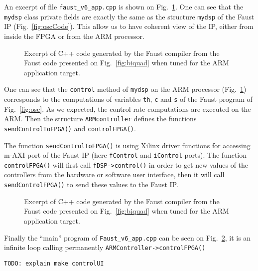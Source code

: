 An excerpt of file {\tt faust\_v6\_app.cpp} is shown on Fig.~\ref{fig:oscARM}. One can see that the {\tt mydsp} class private fields are exactly the same as the structure {\tt mydsp} of the Faust IP (Fig.~\ref{fig:oscCode}). This allow us to have coherent view of the IP, either from inside the FPGA or from the ARM processor. 

\begin{figure}[ht]
  \begin{boxedminipage}{\columnwidth}
    \tiny
    
  \end{boxedminipage}
  \caption{Excerpt of C++ code generated by the Faust compiler from the Faust code presented on Fig.~\ref{fig:biquad} when tuned for the ARM application target.}
  \label{fig:oscARM}
\end{figure}


One can see that the {\tt control} method of {\tt mydsp} on the ARM processor (Fig.~\ref{fig:oscARM}) corresponds to the computations of variables {\tt th}, {\tt c} and {\tt s} of the Faust program of Fig.~\ref{fig:osc}. As we expected, the control rate computations are executed on the ARM. Then the structure {\tt ARMcontroller} defines the functions {\tt sendControlToFPGA()} and {\tt controlFPGA()}.

The function {\tt sendControlToFPGA()} is using Xilinx driver functions for accessing m-AXI port of the Faust IP (here {\tt fControl} and {\tt iControl} ports). The function {\tt controlFPGA()}  will first call {\tt \verb#fDSP->control()#} in order to get new values of the controllers from the hardware or software user interface, then it will call  {\tt sendControlFPGA()} to send these values to the Faust IP.

\begin{figure}[ht]
  \begin{boxedminipage}{\columnwidth}
    \tiny
    
  \end{boxedminipage}
  \caption{Excerpt of C++ code generated by the Faust compiler from the Faust code presented on Fig.~\ref{fig:biquad} when tuned for the ARM application target.}
  \label{fig:oscARM2}
\end{figure}

  Finally the ``main'' program of {\tt Faust\_v6\_app.cpp} can be seen on Fig.~\ref{fig:oscARM2}, it is an infinite loop calling permanently \verb#ARMController->controlFPGA()#



{\tt TODO: explain make controlUI}
